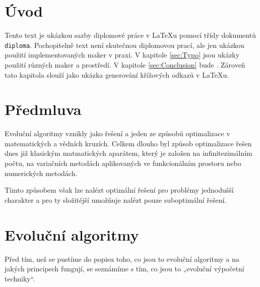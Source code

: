 \documentclass[bc,male,java,dept460]{diploma}		%
\begin{document}
\MakeTitlePages

\tableofcontents
\cleardoublepage	%

\listoftables
\cleardoublepage	%

\listoffigures
\cleardoublepage	%

\lstlistoflistings
\cleardoublepage	%

\section{Úvod}
\label{sec:Uvod}
Tento text je ukázkou sazby diplomové práce v \LaTeX{}u pomocí třídy dokumentů \verb|diploma|.
Pochopitelně text není skutečnou diplomovou prací, ale jen ukázkou použití
implementovaných maker v praxi. V kapitole \ref{sec:Typo} jsou ukázky použití
různých maker a prostředí. V kapitole \ref{sec:Conclusion} bude . Zároveň
tato kapitola slouží jako ukázka generování křížových odkazů v \LaTeX{}u.

\section{Předmluva}
\label{sec:Predmluva}
Evoluční algoritmy vznikly jako řešení a jeden ze způsobů optimalizace v matematických a vědních kruzích. Celkem dlouho byl způsob optimalizace řešen dnes již klasickým matmatických aparátem, který je založen na infinitezimálním počtu, na variačních metodách aplikovaných ve funkcionálním prostoru nebo numerických metodách.

Tímto způsobem však lze nalézt optimální řešení pro problémy jednodušší charakter a pro ty složitější umožňuje nalézt pouze suboptimální řešení.

\section{Evoluční algoritmy}
Před tím, než se pustíme do popisu toho, co jsou to evoluční algoritmy a na jakých principech fungují, se seznámíme s tím, co jsou to „evoluční výpočetní techniky“.
\end{document}
